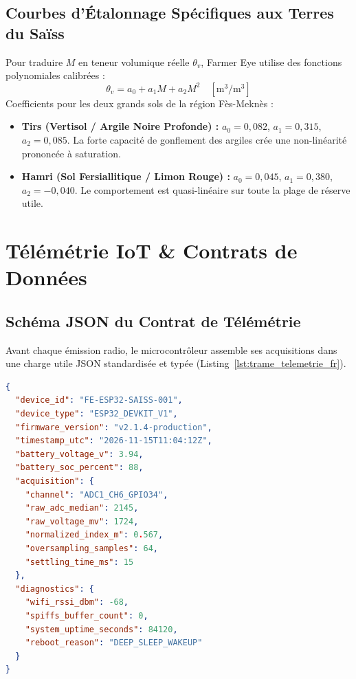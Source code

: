 \documentclass[11pt,a4paper,oneside]{report}
\begin{document}
\section{Courbes d'Étalonnage Spécifiques aux Terres du Saïss}
Pour traduire $M$ en teneur volumique réelle $\theta_v$, Farmer Eye utilise des fonctions polynomiales calibrées :
\begin{equation}
\theta_v = a_0 + a_1 M + a_2 M^2 \quad [\text{m}^3/\text{m}^3]
\end{equation}
Coefficients pour les deux grands sols de la région Fès-Meknès :
\begin{itemize}[leftmargin=*]
    \item \textbf{Tirs (Vertisol / Argile Noire Profonde) :} $a_0 = 0,082$, $a_1 = 0,315$, $a_2 = 0,085$. La forte capacité de gonflement des argiles crée une non-linéarité prononcée à saturation.
    \item \textbf{Hamri (Sol Fersiallitique / Limon Rouge) :} $a_0 = 0,045$, $a_1 = 0,380$, $a_2 = -0,040$. Le comportement est quasi-linéaire sur toute la plage de réserve utile.
\end{itemize}

\chapter{Télémétrie IoT \& Contrats de Données}

\section{Schéma JSON du Contrat de Télémétrie}
Avant chaque émission radio, le microcontrôleur assemble ses acquisitions dans une charge utile JSON standardisée et typée (Listing~\ref{lst:trame_telemetrie_fr}).

\begin{lstlisting}[language=json,caption={Schéma JSON officiel de la télémétrie des boîtiers Farmer Eye.},label={lst:trame_telemetrie_fr}]
{
  "device_id": "FE-ESP32-SAISS-001",
  "device_type": "ESP32_DEVKIT_V1",
  "firmware_version": "v2.1.4-production",
  "timestamp_utc": "2026-11-15T11:04:12Z",
  "battery_voltage_v": 3.94,
  "battery_soc_percent": 88,
  "acquisition": {
    "channel": "ADC1_CH6_GPIO34",
    "raw_adc_median": 2145,
    "raw_voltage_mv": 1724,
    "normalized_index_m": 0.567,
    "oversampling_samples": 64,
    "settling_time_ms": 15
  },
  "diagnostics": {
    "wifi_rssi_dbm": -68,
    "spiffs_buffer_count": 0,
    "system_uptime_seconds": 84120,
    "reboot_reason": "DEEP_SLEEP_WAKEUP"
  }
}
\end{lstlisting}
\end{document}
